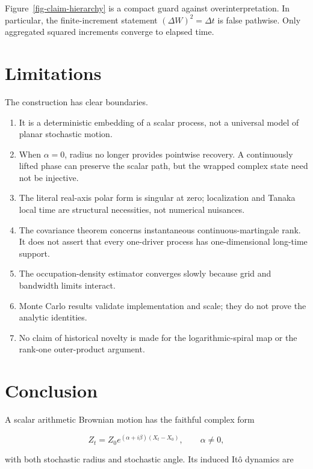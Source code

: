 \documentclass[
  english,
  10pt,
  letterpaper,
  DIV=11,
  numbers=noendperiod]{scrartcl}
\providecommand{\tightlist}{%
  \setlength{\itemsep}{0pt}\setlength{\parskip}{0pt}}
\theoremstyle{plain}
\theoremstyle{remark}
\begin{document}
Figure~\ref{fig-claim-hierarchy} is a compact guard against
overinterpretation. In particular, the finite-increment statement
\((\Delta W)^2=\Delta t\) is false pathwise. Only aggregated squared
increments converge to elapsed time.

\section{Limitations}\label{sec-limitations}

The construction has clear boundaries.

\begin{enumerate}
\def\labelenumi{\arabic{enumi}.}
\tightlist
\item
  It is a deterministic embedding of a scalar process, not a universal
  model of planar stochastic motion.
\item
  When \(\alpha=0\), radius no longer provides pointwise recovery. A
  continuously lifted phase can preserve the scalar path, but the
  wrapped complex state need not be injective.
\item
  The literal real-axis polar form is singular at zero; localization and
  Tanaka local time are structural necessities, not numerical nuisances.
\item
  The covariance theorem concerns instantaneous continuous-martingale
  rank. It does not assert that every one-driver process has
  one-dimensional long-time support.
\item
  The occupation-density estimator converges slowly because grid and
  bandwidth limits interact.
\item
  Monte Carlo results validate implementation and scale; they do not
  prove the analytic identities.
\item
  No claim of historical novelty is made for the logarithmic-spiral map
  or the rank-one outer-product argument.
\end{enumerate}

\section{Conclusion}\label{sec-conclusion}

A scalar arithmetic Brownian motion has the faithful complex form

\[
Z_t=Z_0e^{(\alpha+i\beta)(X_t-X_0)},\qquad \alpha\ne0,
\]

with both stochastic radius and stochastic angle. Its induced Itô
dynamics are
\end{document}
